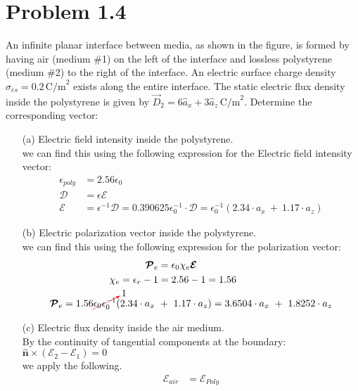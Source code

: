 \documentclass[12pt]{article}
\begin{document}
\section*{Problem 1.4}
An infinite planar interface between media, as shown in the figure, is formed by having air (medium \#1) on the left of the interface and lossless polystyrene (medium \#2) to the right of the interface. An electric surface charge density \( \sigma_{es} = 0.2 \, \text{C/m}^2 \) exists along the entire interface. The static electric flux density inside the polystyrene is given by \( \vec{D}_2 = 6\hat{a}_x + 3\hat{a}_z \, \text{C/m}^2 \).
Determine the corresponding vector:
\begin{itemize}
\item[(a)] Electric field intensity inside the polystyrene. \\
  we can find this using the following expression for the Electric field intensity vector:
  \begin{align*}
    \epsilon_{poly} &= 2.56\epsilon_0 \\
    \bm{\mathcal{D}} &= \epsilon\bm{\mathcal{E}}\\
    \bm{\mathcal{E}} &= \epsilon^{-1}\bm{\mathcal{D}} = 0.390625\epsilon_0^{-1}\cdot\bm{\mathcal{D}} = \epsilon_0^{-1} (2.34\cdot a_x\ +\ 1.17\cdot a_z)
  \end{align*}
\item[(b)] Electric polarization vector inside the polystyrene.\\ 
  we can find this using the following expression for the polarization vector:
  \begin{align*}
    \bm{\mathcal{P}}_e &= \epsilon_0\chi_e\bm{\mathcal{E}}\\
    \chi_e = \epsilon_r- 1 &= 2.56 - 1 = 1.56 \\
    \bm{\mathcal{P}}_e = 1.56\textcolor{red}{\cancelto{\textcolor{black}{1}}{\textcolor{black}{\epsilon_0\epsilon_0^{-1}}}} (2.34\cdot a_x\ &+\ 1.17\cdot a_z) = 3.6504\cdot a_x\ +\ 1.8252\cdot a_z 
  \end{align*}
\item[(c)] Electric flux density inside the air medium.\\ 
  By the continuity of tangential components at the boundary: \\
  $\mathbf{\hat n}\times(\bm{\mathcal{E}}_2 - \bm{\mathcal{E}}_1) = 0$\\
  we apply the following.
  \begin{align*}
    \bm{\mathcal{E}}_{air} &= \bm{\mathcal{E}}_{Poly}\\

\end{align*}
\end{itemize}
\end{document}
